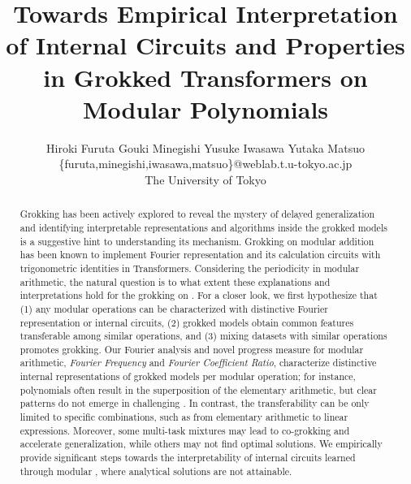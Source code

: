\documentclass[10pt]{article} %
\title{Towards Empirical Interpretation of Internal Circuits and Properties in Grokked Transformers on Modular Polynomials}
\author{\name Hiroki Furuta \quad Gouki Minegishi \quad Yusuke Iwasawa \quad Yutaka Matsuo \\
    \email \{furuta,minegishi,iwasawa,matsuo\}@weblab.t.u-tokyo.ac.jp \\
    \addr The University of Tokyo
}
\newcommand{\update}[1]{{\color{black}{#1}}}
\begin{document}
\maketitle

\begin{abstract}
Grokking has been actively explored to reveal the mystery of delayed generalization and identifying interpretable representations and algorithms inside the grokked models is a suggestive hint to understanding its mechanism.
Grokking on modular addition has been known to implement Fourier representation and its calculation circuits with trigonometric identities in Transformers.
Considering the periodicity in modular arithmetic, the natural question is to what extent these explanations and interpretations hold for the grokking on \update{other modular operations beyond addition}.
For a closer look, we first hypothesize that (1) any modular operations can be characterized with distinctive Fourier representation or internal circuits, (2) grokked models obtain common features transferable among similar operations, and (3) mixing datasets with similar operations promotes grokking. \update{Then, we extensively examine them by learning Transformers on complex modular arithmetic tasks, including polynomials.}
Our Fourier analysis and novel progress measure for modular arithmetic, \textit{Fourier Frequency \update{Density}} and \textit{Fourier Coefficient Ratio}, characterize distinctive internal representations of grokked models per modular operation; for instance, polynomials often result in the superposition of the \update{Fourier components seen in} elementary arithmetic, but clear patterns do not emerge in challenging \update{non-factorizable polynomials}.
In contrast, \update{our ablation study on the pre-grokked models reveals that} the transferability \update{among the models grokked with each operation} can be only limited to specific combinations, such as from elementary arithmetic to linear expressions. Moreover, some multi-task mixtures may lead to co-grokking \update{-- where grokking simultaneously happens for all the tasks --} and accelerate generalization, while others may not find optimal solutions.
We empirically provide significant steps towards the interpretability of internal circuits learned through modular \update{operations}, where analytical solutions are not attainable.

\end{abstract}
\end{document}
